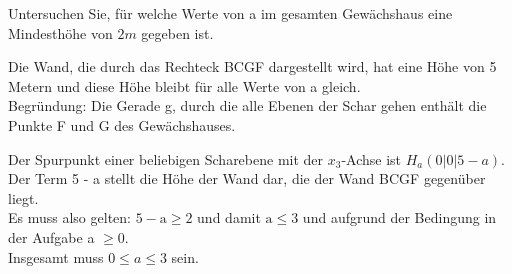 \documentclass[10pt]{article}
\begin{document}
Untersuchen Sie, für welche Werte von a im gesamten Gewächshaus eine Mindesthöhe von $2 m$ gegeben ist.

Die Wand, die durch das Rechteck BCGF dargestellt wird, hat eine Höhe von 5 Metern und diese Höhe bleibt für alle Werte von a gleich.\\
Begründung: Die Gerade g, durch die alle Ebenen der Schar gehen enthält die Punkte F und G des Gewächshauses.

Der Spurpunkt einer beliebigen Scharebene mit der $x_{3}$-Achse ist $H_{a}(0|0| 5-a)$. Der Term 5 - a stellt die Höhe der Wand dar, die der Wand BCGF gegenüber liegt.\\
Es muss also gelten: $5-\mathrm{a} \geq 2$ und damit $\mathrm{a} \leq 3$ und aufgrund der Bedingung in der Aufgabe a $\geq 0$.\\
Insgesamt muss $0 \leq a \leq 3$ sein.
\end{document}
